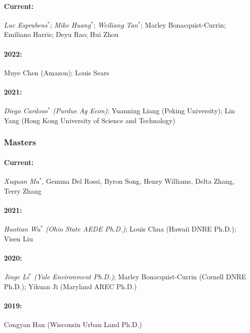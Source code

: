 \documentclass[12pt]{res} %
\begin{document}
\begin{resume}
\paragraph{Current:} \textit{Luc Esprabens}$^*$; \textit{Mike Huang}$^*$; \textit{Weiliang Tan}$^*$; Marley Bonacquist-Currin; Emiliano Harris; Deyu Rao; Hui Zhou
\vspace{-.4in}
\paragraph{2022:} Muye Chen (Amazon); Louis Sears
\vspace{-.4in}
\paragraph{2021:} \textit{Diego Cardoso$^*$ (Purdue Ag Econ)}; Yuanning Liang (Peking University); Lin Yang (Hong Kong University of Science and Technology)

\vspace{-.2in}

\subsubsection{Masters}\vspace{-.2in}
\paragraph{Current:} \textit{Xuquan Ma$^*$}, Gemma Del Rossi, Byron Song, Henry Williams, Delta Zhang, Terry Zhang
\vspace{-.4in}
\paragraph{2021:} \textit{Haotian Wu$^*$ (Ohio State AEDE Ph.D.)}; Louis Chua (Hawaii DNRE Ph.D.); Visen Liu
\vspace{-.4in}
\paragraph{2020:} \textit{Jinge Li$^*$ (Yale Environment Ph.D.)}; Marley Bonacquist-Currin (Cornell DNRE Ph.D.); Yikuan Ji (Maryland AREC Ph.D.)
\vspace{-.4in}
\paragraph{2019:} Congyan Han (Wisconsin Urban Land Ph.D.)


\end{resume}
\end{document}
